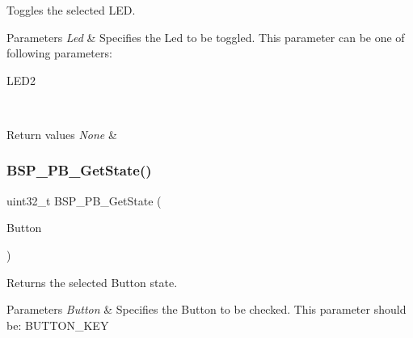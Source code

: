 Toggles the selected L\+ED. 


\begin{DoxyParams}{Parameters}
{\em Led} & Specifies the Led to be toggled. This parameter can be one of following parameters\+: \begin{DoxyItemize}
\item L\+E\+D2 \end{DoxyItemize}
\\
\hline
\end{DoxyParams}

\begin{DoxyRetVals}{Return values}
{\em None} & \\
\hline
\end{DoxyRetVals}
\mbox{\label{group__B-L072Z-LRWAN1__LOW__LEVEL__Exported__Functions_ga8f0978b6cffda9c67266ddfdb3a0abf7}} 
\subsubsection{\texorpdfstring{B\+S\+P\+\_\+\+P\+B\+\_\+\+Get\+State()}{BSP\_PB\_GetState()}}
{\footnotesize\ttfamily uint32\+\_\+t B\+S\+P\+\_\+\+P\+B\+\_\+\+Get\+State (\begin{DoxyParamCaption}\item[{\hyperlink{group__B-L072Z-LRWAN1__LOW__LEVEL__Exported__Types_ga643816dfbad5c734fc25a29ce8d35bb1}{Button\+\_\+\+Type\+Def}}]{Button }\end{DoxyParamCaption})}



Returns the selected Button state. 


\begin{DoxyParams}{Parameters}
{\em Button} & Specifies the Button to be checked. This parameter should be\+: B\+U\+T\+T\+O\+N\+\_\+\+K\+EY \\
\hline
\end{DoxyParams}


